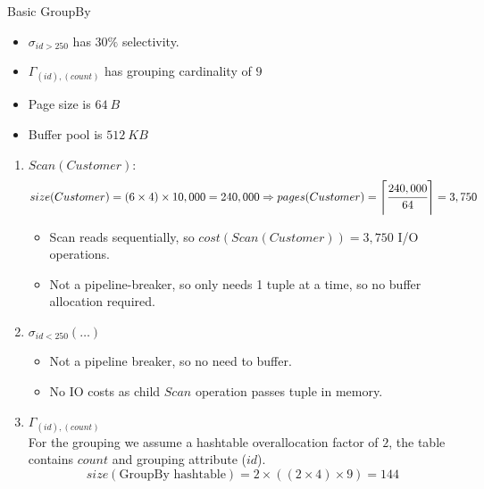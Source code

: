 \begin{examplebox}{Basic GroupBy}
\begin{minipage}{.79\textwidth}
\begin{itemize}
      \item $\sigma_{id > 250}$ has $30\%$ selectivity.
      \item $\Gamma_{(id), (count)}$ has grouping cardinality of $9$
      \item Page size is $64 \ B$
      \item Buffer pool is $512 \ KB$
    \end{itemize}
  \end{minipage}
  \tcblower
  \begin{enumerate}
    \item { $Scan(Customer)$:
      \[size(Customer) = (6 \times 4) \times 10,000 = 240,000 \Rightarrow pages(Customer) = \left\lceil \cfrac{240,000}{64} \right\rceil = 3,750\]
      \begin{itemize}
        \item Scan reads sequentially, so $cost(Scan(Customer)) = 3,750$ I/O operations. 
        \item Not a pipeline-breaker, so only needs 1 tuple at a time, so no buffer allocation required.
      \end{itemize}
    }
    \item { $\sigma_{id < 250}(\dots)$
      \begin{itemize}
        \item Not a pipeline breaker, so no need to buffer.
        \item No IO costs as child $Scan$ operation passes tuple in memory.
      \end{itemize}
    }
    \item { $\Gamma_{(id),(count)}$
      \\ For the grouping we assume a hashtable overallocation factor of $2$, the table contains $count$ and grouping attribute ($id$).
      \[size(\text{GroupBy hashtable}) = 2 \times ((2 \times 4) \times 9) = 144\]
    }
  \end{enumerate}
\end{examplebox}

